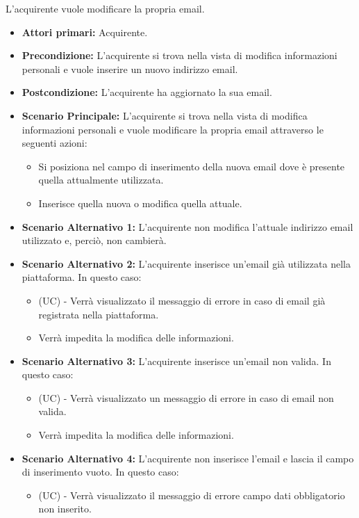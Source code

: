 L'acquirente vuole modificare la propria email.
\begin{itemize}
    \item \textbf{Attori primari:} Acquirente.
    \item \textbf{Precondizione:} L'acquirente si trova nella vista di modifica informazioni personali e vuole inserire un nuovo indirizzo email.
    \item \textbf{Postcondizione:} L'acquirente ha aggiornato la sua email.
    \item \textbf{Scenario Principale:} L'acquirente si trova nella vista di modifica informazioni personali e vuole modificare la propria email attraverso le seguenti azioni:
        \begin{itemize}
            \item Si posiziona nel campo di inserimento della nuova email dove è presente quella attualmente utilizzata.
            \item Inserisce quella nuova o modifica quella attuale.
        \end{itemize}
    \item \textbf{Scenario Alternativo 1:} L'acquirente non modifica l'attuale indirizzo email utilizzato e, perciò, non cambierà.
    \item \textbf{Scenario Alternativo 2:} L'acquirente inserisce un'email già utilizzata nella piattaforma. In questo caso:
    \begin{itemize}
        \item (UC) - Verrà visualizzato il messaggio di errore in caso di email già registrata nella piattaforma.
        \item Verrà impedita la modifica delle informazioni.
    \end{itemize}
    \item \textbf{Scenario Alternativo 3:} L'acquirente inserisce un'email non valida. In questo caso:
    \begin{itemize}
        \item (UC) - Verrà visualizzato un messaggio di errore in caso di email non valida.
        \item Verrà impedita la modifica delle informazioni.
    \end{itemize}
    \item \textbf{Scenario Alternativo 4:} L'acquirente non inserisce l'email e lascia il campo di inserimento vuoto. In questo caso:
    \begin{itemize}
        \item (UC) - Verrà visualizzato il messaggio di errore campo dati obbligatorio non inserito.

\end{itemize}
\end{itemize}
